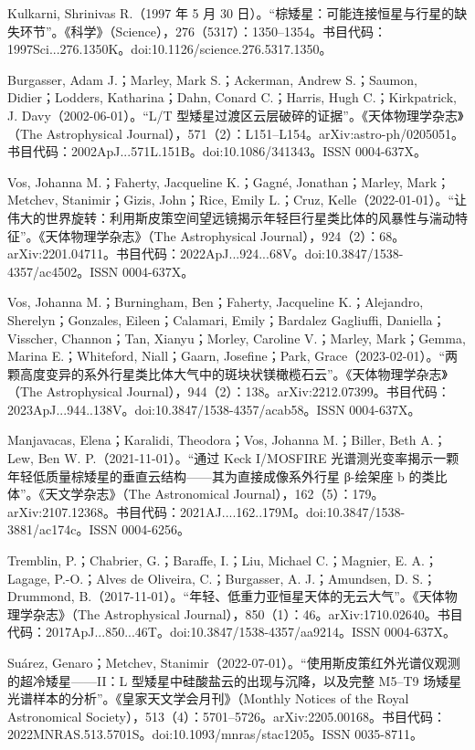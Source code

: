 \begin{enumerate}
Kulkarni, Shrinivas R.（1997 年 5 月 30 日）。“棕矮星：可能连接恒星与行星的缺失环节”。《科学》（Science），276（5317）：1350–1354。书目代码：1997Sci...276.1350K。doi:10.1126/science.276.5317.1350。

Burgasser, Adam J.；Marley, Mark S.；Ackerman, Andrew S.；Saumon, Didier；Lodders, Katharina；Dahn, Conard C.；Harris, Hugh C.；Kirkpatrick, J. Davy（2002-06-01）。“L/T 型矮星过渡区云层破碎的证据”。《天体物理学杂志》（The Astrophysical Journal），571（2）：L151–L154。arXiv:astro-ph/0205051。书目代码：2002ApJ...571L.151B。doi:10.1086/341343。ISSN 0004-637X。

Vos, Johanna M.；Faherty, Jacqueline K.；Gagné, Jonathan；Marley, Mark；Metchev, Stanimir；Gizis, John；Rice, Emily L.；Cruz, Kelle（2022-01-01）。“让伟大的世界旋转：利用斯皮策空间望远镜揭示年轻巨行星类比体的风暴性与湍动特征”。《天体物理学杂志》（The Astrophysical Journal），924（2）：68。arXiv:2201.04711。书目代码：2022ApJ...924...68V。doi:10.3847/1538-4357/ac4502。ISSN 0004-637X。

Vos, Johanna M.；Burningham, Ben；Faherty, Jacqueline K.；Alejandro, Sherelyn；Gonzales, Eileen；Calamari, Emily；Bardalez Gagliuffi, Daniella；Visscher, Channon；Tan, Xianyu；Morley, Caroline V.；Marley, Mark；Gemma, Marina E.；Whiteford, Niall；Gaarn, Josefine；Park, Grace（2023-02-01）。“两颗高度变异的系外行星类比体大气中的斑块状镁橄榄石云”。《天体物理学杂志》（The Astrophysical Journal），944（2）：138。arXiv:2212.07399。书目代码：2023ApJ...944..138V。doi:10.3847/1538-4357/acab58。ISSN 0004-637X。

Manjavacas, Elena；Karalidi, Theodora；Vos, Johanna M.；Biller, Beth A.；Lew, Ben W. P.（2021-11-01）。“通过 Keck I/MOSFIRE 光谱测光变率揭示一颗年轻低质量棕矮星的垂直云结构——其为直接成像系外行星 β-绘架座 b 的类比体”。《天文学杂志》（The Astronomical Journal），162（5）：179。arXiv:2107.12368。书目代码：2021AJ....162..179M。doi:10.3847/1538-3881/ac174c。ISSN 0004-6256。

Tremblin, P.；Chabrier, G.；Baraffe, I.；Liu, Michael C.；Magnier, E. A.；Lagage, P.-O.；Alves de Oliveira, C.；Burgasser, A. J.；Amundsen, D. S.；Drummond, B.（2017-11-01）。“年轻、低重力亚恒星天体的无云大气”。《天体物理学杂志》（The Astrophysical Journal），850（1）：46。arXiv:1710.02640。书目代码：2017ApJ...850...46T。doi:10.3847/1538-4357/aa9214。ISSN 0004-637X。

Suárez, Genaro；Metchev, Stanimir（2022-07-01）。“使用斯皮策红外光谱仪观测的超冷矮星——II：L 型矮星中硅酸盐云的出现与沉降，以及完整 M5–T9 场矮星光谱样本的分析”。《皇家天文学会月刊》（Monthly Notices of the Royal Astronomical Society），513（4）：5701–5726。arXiv:2205.00168。书目代码：2022MNRAS.513.5701S。doi:10.1093/mnras/stac1205。ISSN 0035-8711。


\end{enumerate}
